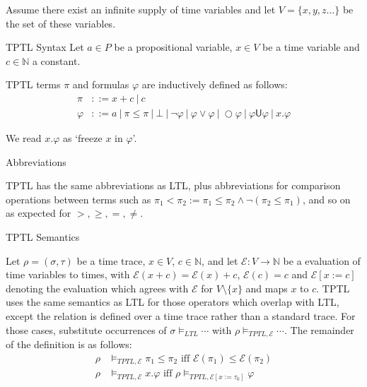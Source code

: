 \documentclass[a4paper]{article}
\newcommand{\U}{\mathsf{U}}
\newcommand{\tiff}{\text{ iff }}
\newcommand{\eval}{\mathcal{E}}
\begin{document}
Assume there exist an infinite supply of time variables  and let $V=\{x,y,z\dots\}$ be the set of these variables.

\begin{defn}{TPTL Syntax}\label{tptlsyn}
  Let $a\in P$ be a propositional variable, $x\in V$ be a time variable and $c\in\mathbb{N}$ a constant.

  TPTL terms $\pi$ and formulas $\varphi$ are inductively defined as follows:
  \begin{align*}
    \pi &::= x + c ~|~ c\\
    \varphi &::= a ~|~ \pi \leq \pi ~|~ \bot ~|~ \neg \varphi ~|~\varphi \lor \varphi ~|~ \bigcirc \varphi ~|~ \varphi \U \varphi ~|~ x. \varphi
  \end{align*}
\end{defn}

We read $x. \varphi$ as `freeze $x$ in $\varphi$'.

\begin{notn}{Abbreviations}\label{tptlabbrev}

  TPTL has the same abbreviations as LTL, plus abbreviations for comparison operations between terms such as $\pi_1 < \pi_2 := \pi_1 \leq \pi_2 \land \neg(\pi_2 \leq \pi_1)$, and so on as expected for $>,\geq,=,\neq$.
\end{notn}

\begin{defn}{TPTL Semantics}\label{tptlsem}

  Let $\rho = (\sigma,\tau)$ be a time trace, $x\in V$, $c\in\mathbb{N}$, and let $\eval:V\to\mathbb{N}$ be a evaluation of time variables to times, with $\eval(x + c) = \eval(x) + c$, $\eval(c) = c$ and $\eval[x:=c]$ denoting the evaluation which agrees with $\eval$ for $V\setminus\{x\}$ and maps $x$ to $c$.
  TPTL uses the same semantics as LTL for those operators which overlap with LTL, except the relation is defined over a time trace rather than a standard trace. For those cases, substitute occurrences of $\sigma\vDash_{LTL}\cdots$ with $\rho\vDash_{TPTL,\eval}\cdots$. The remainder of the definition is as follows:
  \begin{align*}
    \rho&\vDash_{TPTL,\eval}\pi_1\leq\pi_2 \tiff \eval(\pi_1)\leq\eval(\pi_2)\\
    \rho&\vDash_{TPTL,\eval} x.\varphi \tiff \rho\vDash_{TPTL,\eval[x:=\tau_0]}\varphi
  \end{align*}
\end{defn}

\end{document}
